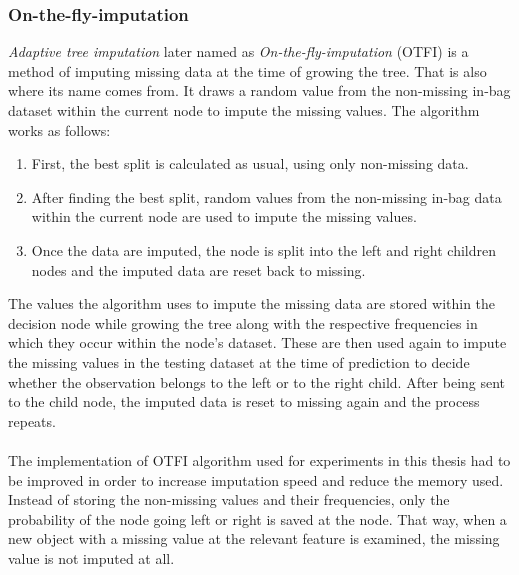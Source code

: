 \documentclass[11pt]{article}
\begin{document}
      \subsubsection{On-the-fly-imputation}
        \label{sec:otfi}
        {\it Adaptive tree imputation}\cite{rsf} later named as {\it On-the-fly-imputation}\cite{otfi} (OTFI) is a method of imputing missing data at the time of growing the tree. That is also where its name comes from. It draws a random value from the non-missing in-bag dataset within the current node to impute the missing values. The algorithm works as follows: 
        \begin{enumerate}
        \item First, the best split is calculated as usual, using only non-missing data.
        \item After finding the best split, random values from the non-missing in-bag data within the current node are used to impute the missing values.
        \item Once the data are imputed, the node is split into the left and right children nodes and the imputed data are reset back to missing.
        \end{enumerate}
        The values the algorithm uses to impute the missing data are stored within the decision node while growing the tree along with the respective frequencies in which they occur within the node's dataset. These are then used again to impute the missing values in the testing dataset at the time of prediction to decide whether the observation belongs to the left or to the right child. After being sent to the child node, the imputed data is reset to missing again and the process repeats.
        \\~\\
        The implementation of OTFI algorithm used for experiments in this thesis had to be improved in order to increase imputation speed and reduce the memory used. Instead of storing the non-missing values and their frequencies, only the probability of the node going left or right is saved at the node. That way, when a new object with a missing value at the relevant feature is examined, the missing value is not imputed at all.
\end{document}
